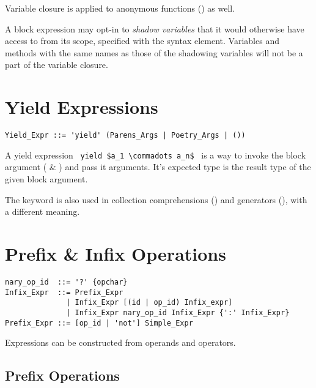 Variable closure is applied to anonymous functions () as well. 

A block expression may opt-in to {\em shadow variables} that it would otherwise have access to from its scope, specified with the  syntax element. Variables and methods with the same names as those of the shadowing variables will not be a part of the variable closure. 





\section{Yield Expressions}
\label{sec:yield-expressions}

\syntax\begin{lstlisting}
Yield_Expr ::= 'yield' (Parens_Args | Poetry_Args | ())
\end{lstlisting}

A yield expression ~\lstinline!yield $a_1 \commadots a_n$!~ is a way to invoke the block argument ( \& ) and pass it arguments. It's expected type is the result type of the given block argument. 

The  keyword is also used in collection comprehensions () and generators (), with a different meaning. 





\section{Prefix \& Infix Operations}
\label{sec:prefix-infix-ops}

\syntax\begin{lstlisting}
nary_op_id  ::= '?' {opchar}
Infix_Expr  ::= Prefix_Expr
              | Infix_Expr [(id | op_id) Infix_expr]
              | Infix_Expr nary_op_id Infix_Expr {':' Infix_Expr}
Prefix_Expr ::= [op_id | 'not'] Simple_Expr
\end{lstlisting}

Expressions can be constructed from operands and operators. 





\subsection{Prefix Operations}

